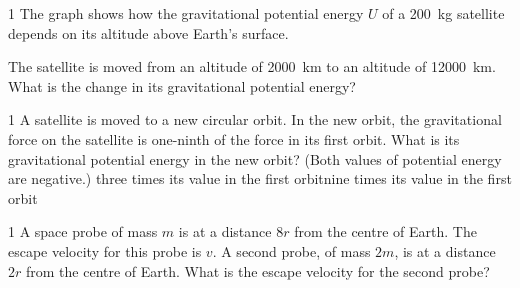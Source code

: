 \begin{practiceq}{1}{}
The graph shows how the gravitational potential energy $U$ of a \qty{200}{kg} satellite depends on
its altitude above Earth's surface.
\begin{center}
\end{center}
The satellite is moved from an altitude of \qty{2000}{km} to an altitude of \qty{12000}{km}. What is
the change in its gravitational potential energy?
\end{practiceq}

\begin{practiceq}{1}{}
A satellite is moved to a new circular orbit. In the new orbit, the gravitational force on the
satellite is one-ninth of the force in its first orbit. What is its gravitational potential
energy in the new orbit? (Both values of potential energy are negative.)
  {three times its value in the first orbit}{nine times its value in the first orbit}
\end{practiceq}

\begin{practiceq}{1}{}
A space probe of mass $m$ is at a distance $8r$ from the centre of Earth. The escape velocity for
this probe is $v$. A second probe, of mass $2m$, is at a distance $2r$ from the centre of Earth.
What is the escape velocity for the second probe?
\end{practiceq}

